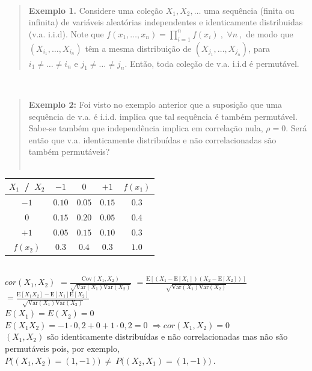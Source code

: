 \documentclass[
]{book}
\begin{document}
\(~\)

\begin{quote}
\textbf{Exemplo 1.} Considere uma coleção \(X_1,X_2,\ldots\) uma sequência (finita ou infinita) de variáveis aleatórias independentes e identicamente distribuidas (v.a. i.i.d). Note que \(f(x_1,\ldots,x_n)=\displaystyle\prod_{i=1}^nf(x_i)~,\) \(\forall n~,\) de modo que \(\left(X_{i_1},\ldots,X_{i_n}\right)\) têm a mesma distribuição de \(\left(X_{j_1},\ldots,X_{j_n}\right)\), para \(i_1\neq\ldots\neq i_n\) e \(j_1\neq\ldots\neq j_n\). Então, toda coleção de v.a. i.i.d é permutável.
\end{quote}

\(~\)

\begin{quote}
\textbf{Exemplo 2:} Foi visto no exemplo anterior que a suposição que uma sequência de v.a. é i.i.d. implica que tal sequência é também permutável. Sabe-se também que independência implica em correlação nula, \(\rho=0\). Será então que v.a. identicamente distribuídas e não correlacionadas são também permutáveis?\\
\(~\)
\end{quote}

\begin{tabular}{ccccc}
\toprule
$X_1~$ / $~X_2$ & $-1$ & $0$ & $+1$ & $f(x_1)$\\
\midrule
$-1$ & $0.10$ & $0.05$ & $0.15$ & $0.3$\\
$0$ & $0.15$ & $0.20$ & $0.05$ & $0.4$\\
$+1$ & $0.05$ & $0.15$ & $0.10$ & $0.3$\\
$f(x_2)$ & $0.3$ & $0.4$ & $0.3$ & $1.0$\\
\bottomrule
\end{tabular}

\(~\)\\
\(cor(X_1,X_2)\)
\(=\frac{\text{Cov}\left(X_1,X_2\right)}{\sqrt{\text{Var}(X_1)\text{Var}(X_2)}}\)
\(=\frac{\text{E}\left[\left(X_1-\text{E}[X_1]\right)\left(X_2-\text{E}[X_2]\right)\right]}{\sqrt{\text{Var}(X_1)\text{Var}(X_2)}}\)
\(=\frac{\text{E}\left[X_1X_2\right]-\text{E}[X_1]\text{E}[X_2]}{\sqrt{\text{Var}(X_1)\text{Var}(X_2)}}\)\\
\(E(X_1)=E(X_2)=0\)\\
\(E(X_1X_2)=-1\cdot0,2+0+1\cdot0,2=0\) \(\Rightarrow cor(X_1,X_2)=0\)\\
\((X_1,X_2)\) são identicamente distribuídas e não correlacionadas mas não são permutáveis pois, por exemplo, \(P\big((X_1,X_2)=(1,-1)\big)~\neq~P\big((X_2,X_1)=(1,-1)\big)~.\)
\end{document}
